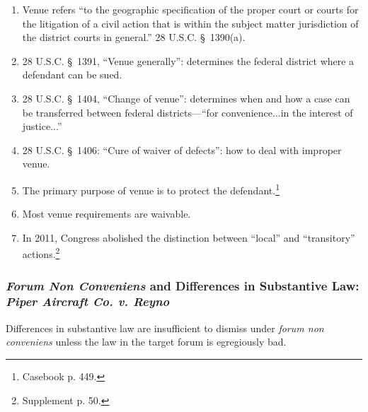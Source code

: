 \begin{enumerate}
    \item Venue refers ``to the geographic specification of the proper court 
    or courts for the litigation of a civil action that is within the subject 
    matter jurisdiction of the district courts in general.'' 28 U.S.C. \S\ 
    1390(a).
    \item 28 U.S.C. \S\ 1391, ``Venue generally'': determines the federal 
    district where a defendant can be sued.
    \item 28 U.S.C. \S\ 1404, ``Change of venue'': determines when and how a 
    case can be transferred between federal districts---``for convenience...in 
    the interest of justice...''
    \item 28 U.S.C. \S\ 1406: ``Cure of waiver of defects'': how to deal with 
    improper venue.
    \item The primary purpose of venue is to protect the 
    defendant.\footnote{Casebook p. 449.}
    \item Most venue requirements are waivable.
    \item In 2011, Congress abolished the distinction between ``local'' and 
    ``transitory'' actions.\footnote{Supplement p. 50.}
\end{enumerate}

\subsubsection{\emph{Forum Non Conveniens} and Differences in Substantive Law: 
\emph{Piper Aircraft Co. v. Reyno}}

Differences in substantive law are insufficient to dismiss under \emph{forum 
non conveniens} unless the law in the target forum is egregiously bad.


